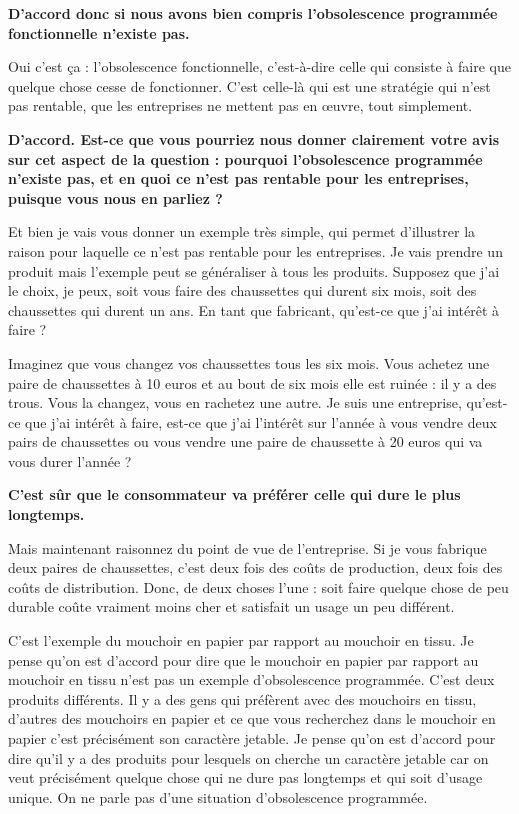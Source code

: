\begin{small}
\textbf{D'accord donc si nous avons bien compris l'obsolescence programmée fonctionnelle n'existe pas.}\smallbreak

Oui c'est ça : l'obsolescence  fonctionnelle, c'est-à-dire celle qui consiste à faire que quelque chose cesse de fonctionner. C'est celle-là qui est une stratégie qui n'est pas rentable, que les entreprises ne mettent pas en œuvre, tout simplement.

\smallbreak\textbf{D'accord. Est-ce que vous pourriez nous donner clairement votre avis sur cet aspect de la question : pourquoi l'obsolescence programmée  n'existe pas, et en quoi ce n'est pas rentable pour les entreprises, puisque vous nous en parliez ?
}\smallbreak

Et bien je vais vous donner un exemple très simple, qui permet d'illustrer la raison pour laquelle ce n'est pas rentable pour les entreprises. Je vais prendre un produit mais l'exemple peut se généraliser à tous les produits. Supposez que j'ai le choix, je peux, soit vous faire des chaussettes qui durent six mois, soit des chaussettes qui durent un ans. En tant que fabricant, qu'est-ce que j'ai intérêt à faire ?  

Imaginez que vous changez vos chaussettes tous les six mois. Vous achetez une paire de chaussettes à 10 euros et au bout de six mois elle est ruinée : il y a des trous. Vous la changez, vous en rachetez une autre. Je suis une entreprise, qu'est-ce que j'ai intérêt à faire, est-ce que j'ai l'intérêt sur l'année à vous vendre deux pairs de chaussettes ou vous vendre une paire de chaussette à 20 euros qui va vous durer l'année ?

\smallbreak\textbf{C'est sûr que le consommateur va préférer celle qui dure le plus longtemps.}\smallbreak

Mais maintenant raisonnez du point de vue de l'entreprise. Si je vous fabrique deux paires de chaussettes, c'est deux fois des coûts de production, deux fois des coûts de distribution. Donc, de deux choses l'une : soit faire quelque chose de peu durable coûte vraiment moins cher et satisfait un usage un peu différent. 

C'est l'exemple du mouchoir en papier par rapport au mouchoir en tissu. Je pense qu'on est d'accord pour dire que le mouchoir en papier par rapport au mouchoir en tissu n'est pas un exemple d'obsolescence programmée. C'est deux produits différents. Il y a des gens qui préfèrent avec des mouchoirs en tissu, d'autres des mouchoirs en papier et ce que vous recherchez dans le mouchoir en papier c'est précisément son caractère jetable. Je pense qu'on est d'accord pour dire qu'il y a des produits pour lesquels on cherche un caractère jetable car on veut précisément quelque chose qui ne dure pas longtemps et qui soit d'usage unique. On ne parle pas d'une situation d'obsolescence programmée. 


\end{small}
